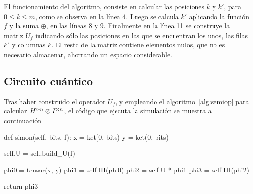 El funcionamiento del algoritmo, consiste en calcular las posiciones $k$ y $k'$, 
para $0 \leq k \leq m$, como se observa en la línea 4. Luego se calcula $k'$ 
aplicando la función $f$ y la suma $\oplus$, en las líneas 8 y 9. Finalmente en 
la línea 11 se construye la matriz $U_f$ indicando sólo las posiciones en las 
que se encuentran los unos, las filas $k'$ y columnas $k$. El resto de la matriz 
contiene elementos nulos, que no es necesario almacenar, ahorrando un espacio 
considerable.

\subsection{Circuito cuántico}
Tras haber construido el operador $U_f$, y empleando el 
algoritmo~\ref{alg:semiop} para calcular ${H}^{\otimes n} \otimes {I}^{\otimes n}$, el código 
que ejecuta la simulación se muestra a continuación
\begin{pycode}
def simon(self, bits, f):
	x = ket(0, bits)
	y = ket(0, bits)

	self.U = self.build_U(f)

	phi0 = tensor(x, y)
	phi1 = self.HI(phi0)
	phi2 = self.U * phi1
	phi3 = self.HI(phi2)

	return phi3
\end{pycode}
